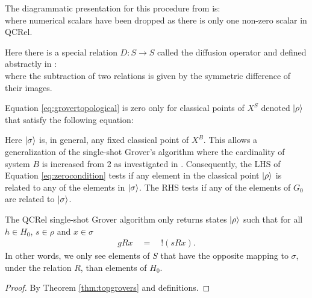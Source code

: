 The diagrammatic presentation for this procedure from \cite{vicary-tqa} is:
\begin{equation}
\label{eq:grovertopological}

\end{equation}
where numerical scalars have been dropped as there is only one non-zero scalar in QCRel.

Here there is a special relation $D:S\to S$ called the diffusion operator and defined abstractly in \cite{vicary-tqa}:
\begin{equation}
\label{eq:difftopological}

\end{equation}
where the subtraction of two relations is given by the symmetric difference of their images.

\begin{theorem}
\label{thm:topgrovers}
Equation \ref{eq:grovertopological} is zero only for classical points of $X^S$ denoted $| \rho \rangle$ that satisfy the following equation:
\begin{equation}
\label{eq:zerocondition}

\end{equation}
\end{theorem}

Here $| \sigma \rangle$ is, in general, any fixed classical point of $X^B$. This allows a generalization of the single-shot Grover's algorithm where the cardinality of system $B$ is increased from 2 as investigated in \cite{vicary-tqa}.
Consequently, the LHS of Equation \ref{eq:zerocondition} tests if any element in the classical point $| \rho \rangle$ is related to any of the elements in $| \sigma \rangle$. The RHS tests if any of the elements of $G_0$ are related to $| \sigma \rangle$.

\begin{proposition}
The QCRel single-shot Grover algorithm only returns states $| \rho \rangle$ such that for all $h \in H_0$, $s\in\rho$ and $x\in \sigma$
\begin{align*}
g R x \quad = \quad !(s R x) .
\end{align*}
In other words, we only see elements of $S$ that have the opposite mapping to $\sigma$, under the relation $R$, than elements of $H_0$.
\end{proposition}
\begin{proof}
By Theorem \ref{thm:topgrovers} and definitions.
\end{proof}

